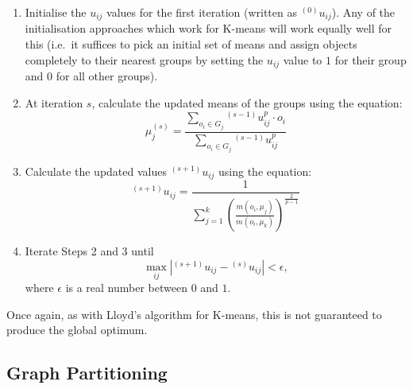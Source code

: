 \begin{enumerate}

\item Initialise the $u_{ij}$ values for the first iteration (written as ${}^{(0)}u_{ij}$). Any of the initialisation approaches which work for K-means will work equally well for this (i.e.~it suffices to pick an initial set of means and assign objects completely to their nearest groups by setting the $u_{ij}$ value to $1$ for their group and $0$ for all other groups).

\item At iteration $s$, calculate the updated means of the groups using the equation:
%
\[
\mu_j^{(s)} = \frac{\displaystyle \sum_{o_i \in G_j} {}^{(s-1)}u_{ij}^p \cdot o_i}{\displaystyle \sum_{o_i \in G_j} {}^{(s-1)}u_{ij}^p}
\]

\item Calculate the updated values ${}^{(s+1)}u_{ij}$ using the equation:
%
\[
{}^{(s+1)}u_{ij} = \frac{1}{\displaystyle \sum_{j=1}^k \left( \frac{m(o_i, \mu_j)}{m(o_i, \mu_k)} \right)^{\frac{2}{p-1}}}
\]

\item Iterate Steps 2 and 3 until
%
\[
\max_{ij} |{}^{(s+1)}u_{ij} - {}^{(s)}u_{ij}| < \epsilon,
\]
%
where $\epsilon$ is a real number between $0$ and $1$.

\end{enumerate}

\noindent Once again, as with Lloyd's algorithm for K-means, this is not guaranteed to produce the global optimum.

\subsection{Graph Partitioning}

